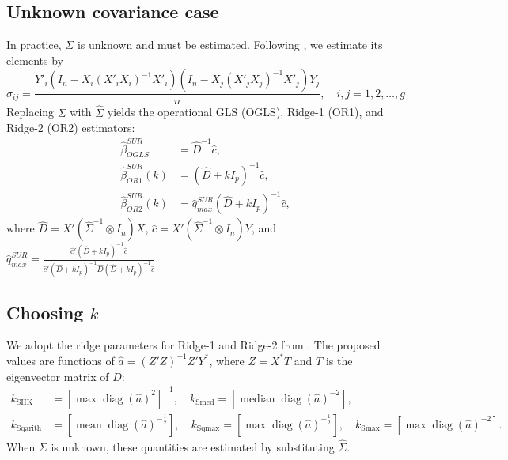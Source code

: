 \documentclass[twoside]{article}
\begin{document}
\subsection{Unknown covariance case}
In practice, $\Sigma$ is unknown and must be estimated. Following \cite{firinguetti1997}, we estimate its elements by 
\begin{equation}
\hat{\sigma}_{ij} = \frac{Y'_i \left(I_n - X_i (X'_i X_i)^{-1} X'_i\right) \left(I_n - X_j (X'_j X_j)^{-1} X'_j\right) Y_j}{n}, \quad i, j = 1, 2, \ldots, g
\label{eq:sigma_hat}
\end{equation}
Replacing $\Sigma$ with $\hat{\Sigma}$ yields the operational GLS (OGLS), Ridge-1 (OR1), and Ridge-2 (OR2) estimators:
\begin{align}
\hat{\beta}^{SUR}_{OGLS} &= \hat{D}^{-1}\hat{c}, \label{eq:10} \\
\hat{\beta}^{SUR}_{OR1}(k) &= (\hat{D} + kI_p)^{-1}\hat{c}, \label{eq:11} \\
\hat{\beta}^{SUR}_{OR2}(k) &= \hat{q}^{SUR}_{max} (\hat{D} + kI_p)^{-1}\hat{c}, \label{eq:12}
\end{align}
where $\hat{D} = X'(\hat{\Sigma}^{-1} \otimes I_n)X$, $\hat{c} = X'(\hat{\Sigma}^{-1} \otimes I_n)Y$, and $\hat{q}^{SUR}_{max} = \frac{\hat{c}'(\hat{D} + kI_p)^{-1}\hat{c}}{\hat{c}'(\hat{D} + kI_p)^{-1}\hat{D}(\hat{D} + kI_p)^{-1}\hat{c}}$.

\subsection{Choosing $k$}
We adopt the ridge parameters for Ridge-1 and Ridge-2 from \cite{alkhamisi2008}. The proposed values are functions of $\hat{a} = (Z'Z)^{-1}Z'Y^{*}$, where $Z = X^{*}T$ and $T$ is the eigenvector matrix of $D$:
\begin{equation}
\begin{aligned}
k_{\text{SHK}} &= \left[\max \operatorname{diag}(\hat{a})^2\right]^{-1}, \quad
k_{\text{Smed}} = \left[\operatorname{median} \operatorname{diag}(\hat{a})^{-2}\right], \\
k_{\text{Sqarith}} &= \left[\operatorname{mean} \operatorname{diag}(\hat{a})^{-\frac{1}{2}}\right], \quad
k_{\text{Sqmax}} = \left[\max \operatorname{diag}(\hat{a})^{-\frac{1}{2}}\right], \quad
k_{\text{Smax}} = \left[\max \operatorname{diag}(\hat{a})^{-2}\right].
\end{aligned}
\end{equation}
When $\Sigma$ is unknown, these quantities are estimated by substituting $\hat{\Sigma}$.
\end{document}
